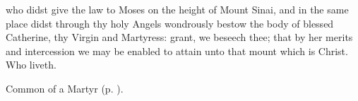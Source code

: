 {} who didst give the law to Moses on the height of Mount Sinai, and in the same place didst through thy holy Angels wondrously bestow the body of blessed Catherine, thy Virgin and Martyress: grant, we beseech thee; that by her merits and intercession we may be enabled to attain unto that mount which is Christ. Who liveth.


\begin{rubric}
	Common of a Martyr (p. \pageref{CommonMartyrBishopCollect}).
\end{rubric}

